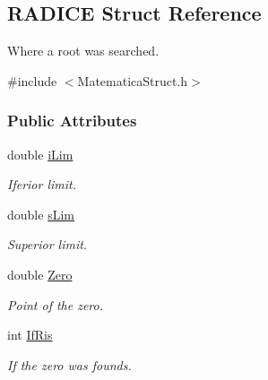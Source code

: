 \hypertarget{structRADICE}{\subsection{\-R\-A\-D\-I\-C\-E \-Struct \-Reference}
\label{structRADICE}
}


\-Where a root was searched.  




{\ttfamily \#include $<$\-Matematica\-Struct.\-h$>$}

\subsubsection*{\-Public \-Attributes}
\begin{DoxyCompactItemize}
\item 
\hypertarget{structRADICE_a2ef55b0755809fec048d5151a39f531b}{double \hyperlink{structRADICE_a2ef55b0755809fec048d5151a39f531b}{i\-Lim}}\label{structRADICE_a2ef55b0755809fec048d5151a39f531b}

\begin{DoxyCompactList}\small\item\em \-Iferior limit. \end{DoxyCompactList}\item 
\hypertarget{structRADICE_a8ab38022bf4ac287149faf5fbde17382}{double \hyperlink{structRADICE_a8ab38022bf4ac287149faf5fbde17382}{s\-Lim}}\label{structRADICE_a8ab38022bf4ac287149faf5fbde17382}

\begin{DoxyCompactList}\small\item\em \-Superior limit. \end{DoxyCompactList}\item 
\hypertarget{structRADICE_a6d82c7bcdff1f26e7560b2fb295daf3e}{double \hyperlink{structRADICE_a6d82c7bcdff1f26e7560b2fb295daf3e}{\-Zero}}\label{structRADICE_a6d82c7bcdff1f26e7560b2fb295daf3e}

\begin{DoxyCompactList}\small\item\em \-Point of the zero. \end{DoxyCompactList}\item 
\hypertarget{structRADICE_ac4670df9c457301218ddf343f06970c5}{int \hyperlink{structRADICE_ac4670df9c457301218ddf343f06970c5}{\-If\-Ris}}\label{structRADICE_ac4670df9c457301218ddf343f06970c5}

\begin{DoxyCompactList}\small\item\em \-If the zero was founds. \end{DoxyCompactList}\end{DoxyCompactItemize}


